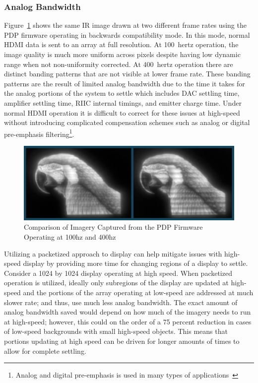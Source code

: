         \subsubsection{Analog Bandwidth}
            \label{sec:analog_bandwidth}
            Figure~\ref{fig:pdp_bird_comparison} shows the same IR image drawn at two different frame rates using the PDP firmware operating in backwards compatibility mode. In this mode, normal HDMI data is sent to an array at full resolution. At \mbox{100 hertz} operation, the image quality is much more uniform across pixels despite having low dynamic range when not non-uniformity corrected. At \mbox{400 hertz} operation there are distinct banding patterns that are not visible at lower frame rate. These banding patterns are the result of limited analog bandwidth due to the time it takes for the analog portions of the system to settle which includes DAC settling time, amplifier settling time, RIIC internal timings, and emitter charge time. Under normal HDMI operation it is difficult to correct for these issues at high-speed without introducing complicated compensation schemes such as analog or digital pre-emphasis filtering\footnote{Analog and digital pre-emphasis is used in many types of applications~\cite{BuckwalterEtAl2006, RafiqueEtAl2015, HuEtAl2017, ThaiEtAl2018, ZhouEtAl2020}}.

            \begin{figure}[t]
                \centering
                \includegraphics[width=1.0\textwidth]{fig/pdp_bird_comparison.png}
                \caption{Comparison of Imagery Captured from the PDP Firmware Operating at 100hz and 400hz}
                \label{fig:pdp_bird_comparison}
            \end{figure}

            Utilizing a packetized approach to display can help mitigate issues with high-speed display by providing more time for changing regions of a display to settle. Consider a 1024 by 1024 display operating at high speed. When packetized operation is utilized, ideally only subregions of the display are updated at high-speed and the portions of the array operating at low-speed are addressed at much slower rate; and thus, use much less analog bandwidth. The exact amount of analog bandwidth saved would depend on how much of the imagery needs to run at high-speed; however, this could on the order of a 75 percent reduction in cases of low-speed backgrounds with small high-speed objects. This means that portions updating at high speed can be driven for longer amounts of times to allow for complete settling.

